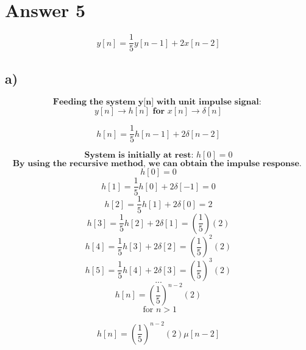 \documentclass[12pt]{article}
\begin{document}
\section*{Answer 5}

\[ y[n] = \frac{1}{5}y[n-1] + 2x[n-2] \]

\subsection*{a)} 
\[ \textbf{Feeding the system y[n] with unit impulse signal: } \]
\[ y[n] \to h[n]  \textbf{  for  }  x[n] \to \delta[n]  \]

\[ h[n] = \frac{1}{5}h[n-1] + 2 \delta [n-2]  \]

\[ \textbf{System is initially at rest: } h[0] = 0 \]
\[ \textbf{By using the recursive method, we can obtain the impulse response. }\]
\[ h[0] = 0 \]
\[ h[1] = \frac{1}{5}h[0] + 2\delta [-1] = 0 \]
\[ h[2] = \frac{1}{5}h[1] + 2\delta [0] = 2 \]
\[ h[3] = \frac{1}{5}h[2] + 2\delta [1] = (\frac{1}{5})(2) \]
\[ h[4] = \frac{1}{5}h[3] + 2\delta [2] = (\frac{1}{5})^{2}(2) \]
\[ h[5] = \frac{1}{5}h[4] + 2\delta [3] = (\frac{1}{5})^{3}(2) \]
\[ ... \]
\[ h[n] = (\frac{1}{5})^{n-2}(2) \]
\[\text{ for } n > 1 \]  

\[ h[n] = (\frac{1}{5})^{n-2}(2) \mu [n-2] \]
\end{document}
